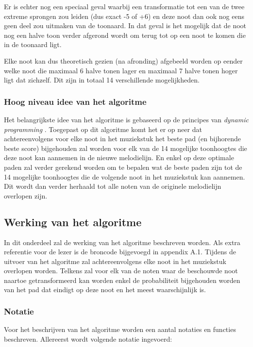 Er is echter nog een speciaal geval waarbij een transformatie tot een van de twee extreme sprongen zou leiden (dus exact -5 of +6) en deze noot dan ook nog eens geen deel zou uitmaken van de toonaard. In dat geval is het mogelijk dat de noot nog een halve toon verder afgerond wordt om terug tot op een noot te komen die in de toonaard ligt.

Elke noot kan dus theoretisch gezien (na afronding) afgebeeld worden op eender welke noot die maximaal 6 halve tonen lager en maximaal 7 halve tonen hoger ligt dat zichzelf. Dit zijn in totaal 14 verschillende mogelijkheden.

\subsubsection{Hoog niveau idee van het algoritme}
Het belangrijkste idee van het algoritme is gebaseerd op de principes van \textit{dynamic programming} \cite{url:DP}. Toegepast op dit algoritme komt het er op neer dat achtereenvolgens voor elke noot in het muziekstuk het beste pad (en bijhorende beste score) bijgehouden zal worden voor elk van de 14 mogelijke toonhoogtes die deze noot kan aannemen in de nieuwe melodielijn. En enkel op deze optimale paden zal verder gerekend worden om te bepalen wat de beste paden zijn tot de 14 mogelijke toonhoogtes die de volgende noot in het muziekstuk kan aannemen. Dit wordt dan verder herhaald tot alle noten van de originele melodielijn overlopen zijn.

\subsection{Werking van het algoritme}
In dit onderdeel zal de werking van het algoritme beschreven worden. Als extra referentie voor de lezer is de broncode bijgevoegd in appendix A.1. Tijdens de uitvoer van het algoritme zal achtereenvolgens elke noot in het muziekstuk overlopen worden. Telkens zal voor elk van de noten waar de beschouwde noot naartoe getransformeerd kan worden enkel de probabiliteit bijgehouden worden van het pad dat eindigt op deze noot en het meest waarschijnlijk is.

\subsubsection{Notatie}
Voor het beschrijven van het algoritme worden een aantal notaties en functies beschreven. Allereerst wordt volgende notatie ingevoerd:

